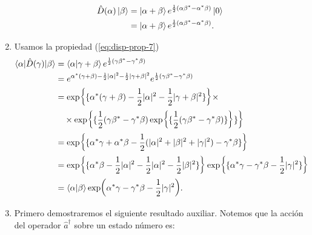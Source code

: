 \begin{enumerate}
        \begin{align}
          \hat{D}(\alpha)\ket{\beta} & = \ket{\alpha + \beta} e^{\frac{1}{2}(\alpha\beta^* - \alpha^*\beta)}\ket{0} \\
                                     & = \ket{\alpha + \beta} e^{\frac{1}{2}(\alpha\beta^* - \alpha^*\beta)}.
        \end{align}
  \item Usamos la propiedad (\ref{eq:disp-prop-7})
        \begin{align}
          \langle \alpha \vert \hat{D}(\gamma)\vert \beta\rangle & = \braket{\alpha}{\gamma + \beta} e^{\frac{1}{2}(\gamma\beta^{*}-\gamma^{*}\beta)}                                                                                                                       \nonumber \\
                                                                 & = e^{\alpha^*(\gamma + \beta) - \frac{1}{2}|\alpha|^2 - \frac{1}{2}|\gamma + \beta|^2}e^{\frac{1}{2}(\gamma\beta^* - \gamma^*\beta)}                                                                     \nonumber \\
                                                                 & = \exp{\{ \alpha^*(\gamma + \beta) - \frac{1}{2}|\alpha|^2 -\frac{1}{2}|\gamma + \beta|^2 \}}\times \nonumber                                                                                                      \\ &\quad \times \exp{\{ \frac{1}{2}(\gamma\beta^* - \gamma^*\beta)\exp{\{\frac{1}{2}(\gamma\beta^* - \gamma^*\beta)\}} \}} \nonumber \\
                                                                 & = \exp{\{ \alpha^*\gamma + \alpha^*\beta - \frac{1}{2}(|\alpha|^2 + |\beta|^2 + |\gamma|^2) - \gamma^*\beta \}}                                                                                          \nonumber \\
                                                                 & = \exp{\{ \alpha^*\beta - \frac{1}{2}|\alpha|^2 - \frac{1}{2}|\alpha|^2 - \frac{1}{2}|\beta|^2 \}} \exp{\{ \alpha^* \gamma - \gamma^*\beta -\frac{1}{2}|\gamma|^2 \}}                                    \nonumber \\
                                                                 & = \braket{\alpha}{\beta}\exp(\alpha^*\gamma - \gamma^*\beta - \frac{1}{2}|\gamma|^2).
        \end{align}
  \item Primero demostraremos el siguiente resultado auxiliar. Notemos que la acción del operador $\hat{a}^{\dagger}$ sobre un estado número es:

\end{enumerate}
